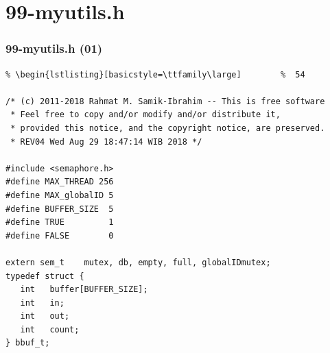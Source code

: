 \documentclass[xcolor=table, notheorems, hyperref={pdfpagelabels=false}]{beamer}
\begin{document}
\section{99-myutils.h}
\begin{frame}[fragile]
\frametitle{99-myutils.h (01)}
\begin{lstlisting}[basicstyle=\ttfamily\footnotesize] %  72
% \begin{lstlisting}[basicstyle=\ttfamily\small]        %  65
% \begin{lstlisting}[basicstyle=\ttfamily\large]        %  54

/* (c) 2011-2018 Rahmat M. Samik-Ibrahim -- This is free software
 * Feel free to copy and/or modify and/or distribute it, 
 * provided this notice, and the copyright notice, are preserved. 
 * REV04 Wed Aug 29 18:47:14 WIB 2018 */

#include <semaphore.h>
#define MAX_THREAD 256
#define MAX_globalID 5
#define BUFFER_SIZE  5
#define TRUE         1
#define FALSE        0

extern sem_t    mutex, db, empty, full, globalIDmutex;
typedef struct {
   int   buffer[BUFFER_SIZE];
   int   in;
   int   out;
   int   count;
} bbuf_t;

\end{lstlisting}
\end{frame}
\end{document}
